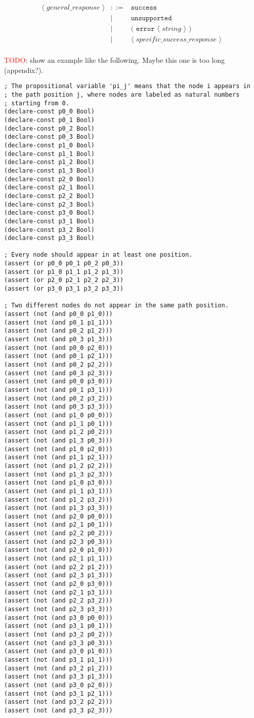 \[
\begin{array}{rcll}
\langle\textit{ general\_response }\rangle & ::= & \texttt{success}\\
& | & \texttt{unsupported}\\
& | & \texttt{( error } \langle\textit{ string }\rangle \texttt{ ) }\\
& | & \langle\textit{ specific\_success\_response }\rangle\\
\end{array}
\]

\textcolor{red}{TODO}: show an example like the following. 
Maybe this one is too long (appendix?).

\begin{verbatim}
; The propositional variable 'pi_j' means that the node i appears in 
; the path position j, where nodes are labeled as natural numbers 
; starting from 0.
(declare-const p0_0 Bool)
(declare-const p0_1 Bool)
(declare-const p0_2 Bool)
(declare-const p0_3 Bool)
(declare-const p1_0 Bool)
(declare-const p1_1 Bool)
(declare-const p1_2 Bool)
(declare-const p1_3 Bool)
(declare-const p2_0 Bool)
(declare-const p2_1 Bool)
(declare-const p2_2 Bool)
(declare-const p2_3 Bool)
(declare-const p3_0 Bool)
(declare-const p3_1 Bool)
(declare-const p3_2 Bool)
(declare-const p3_3 Bool)

; Every node should appear in at least one position.
(assert (or p0_0 p0_1 p0_2 p0_3))
(assert (or p1_0 p1_1 p1_2 p1_3))
(assert (or p2_0 p2_1 p2_2 p2_3))
(assert (or p3_0 p3_1 p3_2 p3_3))

; Two different nodes do not appear in the same path position.
(assert (not (and p0_0 p1_0)))
(assert (not (and p0_1 p1_1)))
(assert (not (and p0_2 p1_2)))
(assert (not (and p0_3 p1_3)))
(assert (not (and p0_0 p2_0)))
(assert (not (and p0_1 p2_1)))
(assert (not (and p0_2 p2_2)))
(assert (not (and p0_3 p2_3)))
(assert (not (and p0_0 p3_0)))
(assert (not (and p0_1 p3_1)))
(assert (not (and p0_2 p3_2)))
(assert (not (and p0_3 p3_3)))
(assert (not (and p1_0 p0_0)))
(assert (not (and p1_1 p0_1)))
(assert (not (and p1_2 p0_2)))
(assert (not (and p1_3 p0_3)))
(assert (not (and p1_0 p2_0)))
(assert (not (and p1_1 p2_1)))
(assert (not (and p1_2 p2_2)))
(assert (not (and p1_3 p2_3)))
(assert (not (and p1_0 p3_0)))
(assert (not (and p1_1 p3_1)))
(assert (not (and p1_2 p3_2)))
(assert (not (and p1_3 p3_3)))
(assert (not (and p2_0 p0_0)))
(assert (not (and p2_1 p0_1)))
(assert (not (and p2_2 p0_2)))
(assert (not (and p2_3 p0_3)))
(assert (not (and p2_0 p1_0)))
(assert (not (and p2_1 p1_1)))
(assert (not (and p2_2 p1_2)))
(assert (not (and p2_3 p1_3)))
(assert (not (and p2_0 p3_0)))
(assert (not (and p2_1 p3_1)))
(assert (not (and p2_2 p3_2)))
(assert (not (and p2_3 p3_3)))
(assert (not (and p3_0 p0_0)))
(assert (not (and p3_1 p0_1)))
(assert (not (and p3_2 p0_2)))
(assert (not (and p3_3 p0_3)))
(assert (not (and p3_0 p1_0)))
(assert (not (and p3_1 p1_1)))
(assert (not (and p3_2 p1_2)))
(assert (not (and p3_3 p1_3)))
(assert (not (and p3_0 p2_0)))
(assert (not (and p3_1 p2_1)))
(assert (not (and p3_2 p2_2)))
(assert (not (and p3_3 p2_3)))


\end{verbatim}
